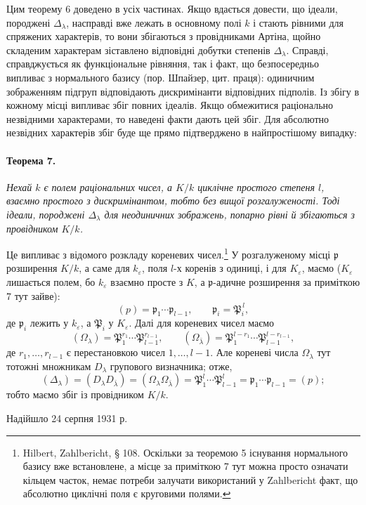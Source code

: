\documentclass[11pt]{article}
\providecommand{\frakp}{\mathfrak{p}}
\begin{document}
Цим теорему 6 доведено в усіх частинах. Якщо вдається довести, що ідеали, породжені \(\Delta_\lambda\), насправді вже лежать в основному полі \(k\) і стають рівними для спряжених характерів, то вони збігаються з провідниками Артіна, щойно складеним характерам зіставлено відповідні добутки степенів \(\Delta_\lambda\). Справді, справджується як функціональне рівняння, так і факт, що безпосередньо випливає з нормального базису (пор. Шпайзер, цит. праця): одиничним зображенням підгруп відповідають дискримінанти відповідних підполів. Із збігу в кожному місці випливає збіг повних ідеалів. Якщо обмежитися раціонально незвідними характерами, то наведені факти дають цей збіг. Для абсолютно незвідних характерів збіг буде ще прямо підтверджено в найпростішому випадку:

\paragraph{Теорема 7.}
\emph{Нехай \(k\) є полем раціональних чисел, а \(K/k\) циклічне простого степеня \(l\), взаємно простого з дискримінантом, тобто без вищої розгалуженості. Тоді ідеали, породжені \(\Delta_\lambda\) для неодиничних зображень, попарно рівні й збігаються з провідником \(K/k\).}

Це випливає з відомого розкладу кореневих чисел.\footnote{Hilbert, Zahlbericht, § 108. Оскільки за теоремою 5 існування нормального базису вже встановлене, а місце за приміткою 7 тут можна просто означати кільцем часток, немає потреби залучати використаний у Zahlbericht факт, що абсолютно циклічні поля є круговими полями.} У розгалуженому місці \(\frakp\) розширення \(K/k\), а саме для \(k_\varepsilon\), поля \(l\)-х коренів з одиниці, і для \(K_\varepsilon\), маємо (\(K_\varepsilon\) лишається полем, бо \(k_\varepsilon\) взаємно просте з \(K\), а \(\frakp\)-адичне розширення за приміткою 7 тут зайве):
\[
        (p)=\frakp_1\cdots\frakp_{l-1},
        \qquad
        \frakp_i=\mathfrak P_i^{\,l},
\]
де \(\frakp_i\) лежить у \(k_\varepsilon\), а \(\mathfrak P_i\) у \(K_\varepsilon\). Далі для кореневих чисел маємо
\[
        (\Omega_\lambda)=\mathfrak P_1^{r_1}\cdots\mathfrak P_{l-1}^{r_{l-1}},
        \qquad
        (\Omega_{\bar\lambda})=
        \mathfrak P_1^{l-r_1}\cdots \mathfrak P_{l-1}^{l-r_{l-1}},
\]
де \(r_1,\ldots,r_{l-1}\) є перестановкою чисел \(1,\ldots,l-1\). Але кореневі числа \(\Omega_\lambda\) тут тотожні множникам \(D_\lambda\) групового визначника; отже,
\[
        (\Delta_\lambda)=(D_\lambda D_{\bar\lambda})
        =(\Omega_\lambda\Omega_{\bar\lambda})
        =\mathfrak P_1^{l}\cdots\mathfrak P_{l-1}^{l}
        =\frakp_1\cdots\frakp_{l-1}=(p);
\]
тобто маємо збіг із провідником \(K/k\).

\begin{center}
Надійшло 24 серпня 1931 р.
\end{center}
\end{document}
